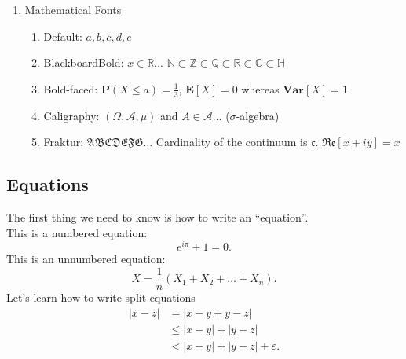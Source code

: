 \documentclass{article}
\begin{document}
\begin{enumerate}
                \item Mathematical Fonts
                \begin{enumerate}
                    \item Default: $a, b, c, d, e$
                    \item BlackboardBold: $x \in \mathbb{R}$... $\mathbb{N} \subset \mathbb{Z} \subset \mathbb{Q} \subset \mathbb{R} \subset \mathbb{C} \subset \mathbb{H}$
                    \item Bold-faced: $\mathbf{P}(X \leq a) = \frac{1}{3}$, $\mathbf{E}[X] = 0$ whereas $\mathbf{Var}[X] = 1$
                    \item Caligraphy: $(\Omega, \mathcal{A}, \mu)$ and $A \in \mathcal{A}$... ($\sigma$-algebra)
                    \item Fraktur: $\mathfrak{ABCDEFG}$... Cardinality of the continuum is $\mathfrak{c}$. $\mathfrak{Re}[x + iy] = x$
                \end{enumerate}
            \end{enumerate}
        \subsection{Equations}
            The first thing we need to know is how to write an ``equation''.\\[3mm] 
            This is a numbered equation:
            \begin{equation}
                e^{i\pi} + 1 = 0.
            \end{equation}
            This is an unnumbered equation: 
            \begin{equation*}
                \bar{X} = \frac{1}{n} (X_{1} + X_{2} + \dots + X_{n}).
            \end{equation*}
            Let's learn how to write split equations
            \begin{equation}
                \begin{split}
                |x - z| & = |x - y + y - z|\\
                        & \leq |x - y| + |y - z|\\
                        & < |x - y| + |y - z| + \varepsilon.
                \end{split}
            \end{equation}
\end{document}
